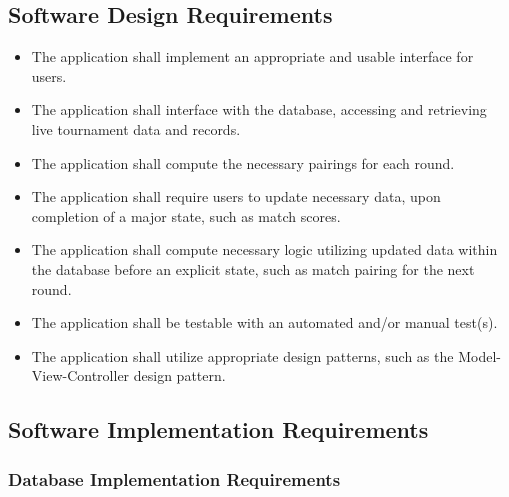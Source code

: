 \documentclass[11pt]{article}
\begin{document}
    \subsection{Software Design Requirements}
    \begin{itemize}
        \item The application shall implement an appropriate and usable interface for users.
        \item The application shall interface with the database, accessing and retrieving live tournament data and records.
        \item The application shall compute the necessary pairings for each round.
        \item The application shall require users to update necessary data, upon completion of a major state, such as match scores.
        \item The application shall compute necessary logic utilizing updated data within the database before an explicit state, such as match pairing for the next round.
        \item The application shall be testable with an automated and/or manual test(s).
        \item The application shall utilize appropriate design patterns, such as the Model-View-Controller design pattern.
    \end{itemize}

    \newpage

    \subsection{Software Implementation Requirements}
    \subsubsection{Database Implementation Requirements}
\end{document}
